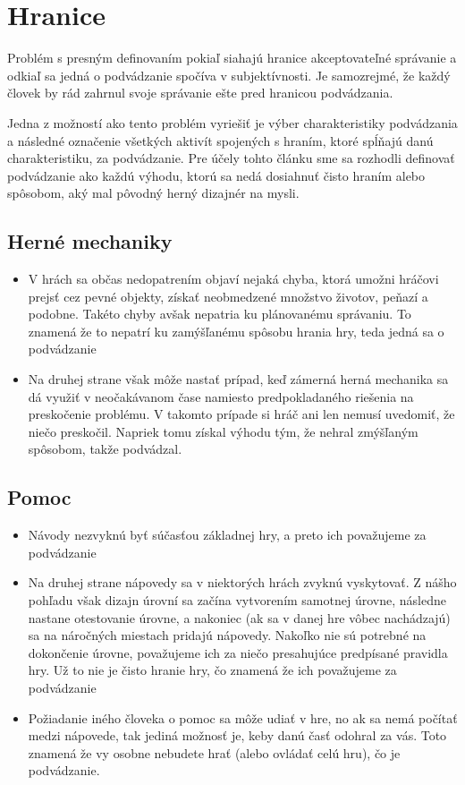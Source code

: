 \documentclass[10pt, oneside, slovak,a4paper]{article}
\begin{document}
\section{Hranice}

Problém s presným definovaním pokiaľ siahajú hranice akceptovateľné správanie a odkiaľ sa jedná o podvádzanie spočíva v subjektívnosti. Je samozrejmé, že každý človek by rád zahrnul svoje správanie ešte pred hranicou podvádzania. %

Jedna z možností ako tento problém vyriešiť je výber charakteristiky podvádzania a následné označenie všetkých aktivít spojených s hraním, ktoré spĺňajú danú charakteristiku, za podvádzanie. Pre účely tohto článku sme sa rozhodli definovať podvádzanie ako každú výhodu, ktorú sa nedá dosiahnuť čisto hraním alebo spôsobom, aký mal pôvodný herný dizajnér na mysli.

\subsection{Herné mechaniky}
\begin{itemize}
\item V hrách sa občas nedopatrením objaví nejaká chyba, ktorá umožni hráčovi prejsť cez pevné objekty, získať neobmedzené množstvo životov, peňazí a podobne. Takéto chyby avšak nepatria ku plánovanému správaniu. To znamená že to nepatrí ku zamýšľanému spôsobu hrania hry, teda jedná sa o podvádzanie

\item Na druhej strane však môže nastať prípad, keď zámerná herná mechanika sa dá využiť v neočakávanom čase namiesto predpokladaného riešenia na preskočenie problému. V takomto prípade si hráč ani len nemusí uvedomiť, že niečo preskočil. Napriek tomu získal výhodu tým, že nehral zmýšľaným spôsobom, takže podvádzal.
\end{itemize}

\subsection{Pomoc}
\begin{itemize}
\item Návody nezvyknú byť súčasťou základnej hry, a preto ich považujeme za podvádzanie
\item Na druhej strane nápovedy sa v niektorých hrách zvyknú vyskytovať. Z nášho pohľadu však dizajn úrovní sa začína vytvorením samotnej úrovne, následne nastane otestovanie úrovne, a nakoniec (ak sa v danej hre vôbec nachádzajú) sa na náročných miestach pridajú nápovedy. Nakoľko nie sú potrebné na dokončenie úrovne, považujeme ich za niečo presahujúce predpísané pravidla hry. Už to nie je čisto hranie hry, čo znamená že ich považujeme za podvádzanie
\item Požiadanie iného človeka o pomoc sa môže udiať v hre, no ak sa nemá počítať medzi nápovede, tak jediná možnosť je, keby danú časť odohral za vás. Toto znamená že vy osobne nebudete hrať (alebo ovládať celú hru), čo je podvádzanie.
\end{itemize}
\end{document}
